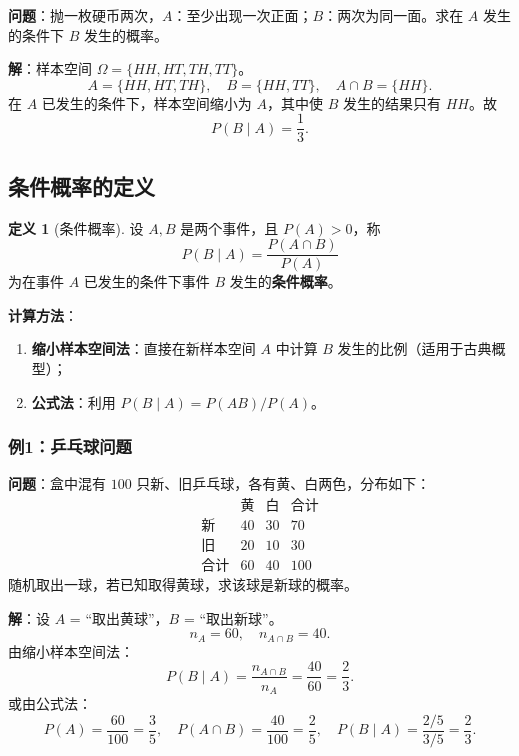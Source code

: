\documentclass[11pt,a4paper]{report}
\theoremstyle{definition}
\newtheorem{definition}{定义}[chapter]
\begin{document}
\textbf{问题}：抛一枚硬币两次，$A$：至少出现一次正面；$B$：两次为同一面。求在 $A$ 发生的条件下 $B$ 发生的概率。

\textbf{解}：样本空间 $\Omega = \{HH, HT, TH, TT\}$。
\[
A = \{HH, HT, TH\}, \quad B = \{HH, TT\}, \quad A \cap B = \{HH\}.
\]
在 $A$ 已发生的条件下，样本空间缩小为 $A$，其中使 $B$ 发生的结果只有 $HH$。故
\[
P(B \mid A) = \frac{1}{3}.
\]

\subsection{条件概率的定义}

\begin{definition}[条件概率]
设 $A, B$ 是两个事件，且 $P(A) > 0$，称
\[
\boxed{P(B \mid A) = \frac{P(A \cap B)}{P(A)}}
\]
为在事件 $A$ 已发生的条件下事件 $B$ 发生的\textbf{条件概率}。
\end{definition}

\textbf{计算方法}：
\begin{enumerate}[label=(\arabic*),leftmargin=2em]
    \item \textbf{缩小样本空间法}：直接在新样本空间 $A$ 中计算 $B$ 发生的比例（适用于古典概型）；
    \item \textbf{公式法}：利用 $P(B \mid A) = P(AB)/P(A)$。
\end{enumerate}

\subsubsection{例1：乒乓球问题}

\textbf{问题}：盒中混有 $100$ 只新、旧乒乓球，各有黄、白两色，分布如下：
\[
\begin{array}{c|cc|c}
 & \text{黄} & \text{白} & \text{合计} \\ \hline
\text{新} & 40 & 30 & 70 \\
\text{旧} & 20 & 10 & 30 \\ \hline
\text{合计} & 60 & 40 & 100
\end{array}
\]
随机取出一球，若已知取得黄球，求该球是新球的概率。

\textbf{解}：设 $A$ = ``取出黄球''，$B$ = ``取出新球''。
\[
n_A = 60, \quad n_{A \cap B} = 40.
\]
由缩小样本空间法：
\[
\boxed{P(B \mid A) = \frac{n_{A \cap B}}{n_A} = \frac{40}{60} = \frac{2}{3}}.
\]
或由公式法：
\[
P(A) = \frac{60}{100} = \frac{3}{5}, \quad P(A \cap B) = \frac{40}{100} = \frac{2}{5}, \quad P(B \mid A) = \frac{2/5}{3/5} = \frac{2}{3}.
\]
\end{document}
